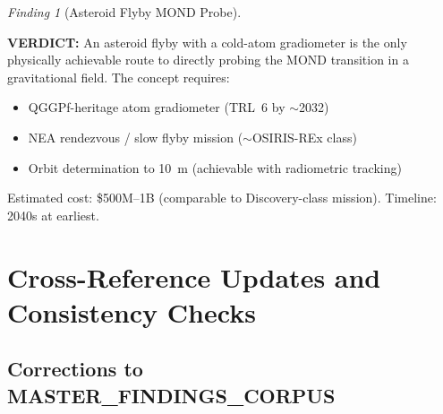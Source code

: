 \documentclass[11pt]{article}
\theoremstyle{definition}
\theoremstyle{remark}
\newtheorem{finding}[theorem]{Finding}
\newcommand{\verdict}[1]{\textcolor{green!50!black}{\textbf{VERDICT:} #1}}
\begin{document}
\begin{finding}[Asteroid Flyby MOND Probe]
\verdict{An asteroid flyby with a cold-atom gradiometer is the
only physically achievable route to directly probing the
MOND transition in a gravitational field. The concept requires:
\begin{itemize}[nosep]
\item QGGPf-heritage atom gradiometer (TRL~6 by $\sim$2032)
\item NEA rendezvous / slow flyby mission ($\sim$OSIRIS-REx class)
\item Orbit determination to 10~m (achievable with radiometric tracking)
\end{itemize}
Estimated cost: \$500M--1B (comparable to Discovery-class mission).
Timeline: 2040s at earliest.}
\end{finding}

\section{Cross-Reference Updates and Consistency Checks}
\label{sec:crossref}

\subsection{Corrections to MASTER\_FINDINGS\_CORPUS}
\end{document}
